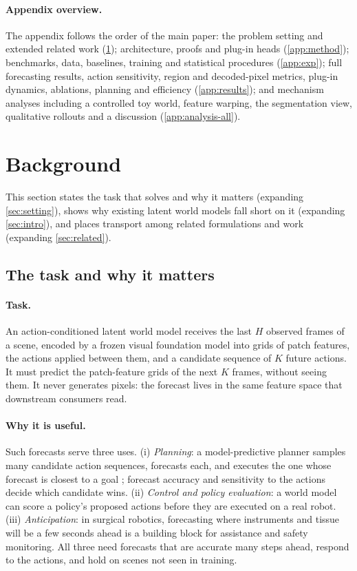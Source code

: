 \paragraph{Appendix overview.} The appendix follows the order of the main paper: the problem setting and extended
related work (\cref{app:background}); architecture, proofs and plug-in heads (\cref{app:method}); benchmarks,
data, baselines, training and statistical procedures (\cref{app:exp}); full forecasting results, action sensitivity,
region and decoded-pixel metrics, plug-in dynamics, ablations, planning and efficiency (\cref{app:results}); and mechanism
analyses including a controlled toy world, feature warping, the segmentation view, qualitative rollouts and a discussion (\cref{app:analysis-all}).

\FloatBarrier
\section{Background}\label{app:background}
This section states the task that \ours{} solves and why it matters (expanding \cref{sec:setting}), shows why existing
latent world models fall short on it (expanding \cref{sec:intro}), and places transport among related formulations and
work (expanding \cref{sec:related}).
\FloatBarrier
\subsection{The task and why it matters}\label{app:setting}
\paragraph{Task.} An action-conditioned latent world model receives the last $H$ observed frames of a scene, encoded by a
frozen visual foundation model into grids of patch features, the actions applied between them, and a candidate sequence
of $K$ future actions. It must predict the patch-feature grids of the next $K$ frames, without seeing them. It never
generates pixels: the forecast lives in the same feature space that downstream consumers read.
\paragraph{Why it is useful.} Such forecasts serve three uses. (i) \emph{Planning}: a model-predictive planner samples
many candidate action sequences, forecasts each, and executes the one whose forecast is closest to a goal
\citep{zhou2025dinowm,maes2026lewm}; forecast accuracy and sensitivity to the actions decide which candidate wins.
(ii) \emph{Control and policy evaluation}: a world model can score a policy's proposed actions before they are executed
on a real robot. (iii) \emph{Anticipation}: in surgical robotics, forecasting where instruments and tissue will be a few
seconds ahead is a building block for assistance and safety monitoring. All three need forecasts that are accurate many
steps ahead, respond to the actions, and hold on scenes not seen in training.
